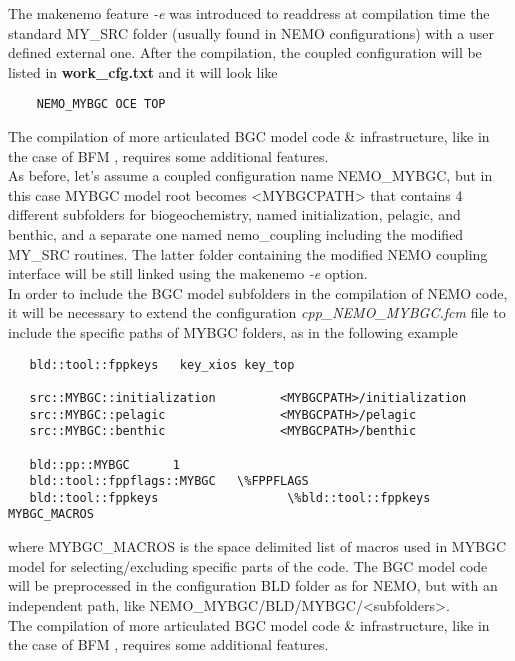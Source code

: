 \documentclass[../main/TOP_manual]{subfiles}
\begin{document}
The makenemo feature \textit{-e} was introduced to readdress at compilation time the standard MY\_SRC folder (usually found in NEMO configurations) with a user defined external one.
After the compilation, the coupled configuration will be listed in \textbf{work\_cfg.txt} and it will look like

\begin{verbatim}
    NEMO_MYBGC OCE TOP
\end{verbatim}

The compilation of more articulated BGC model code \& infrastructure, like in the case of BFM \citep{bfm_nemo_coupling}, requires some additional features. \\

As before, let's assume a coupled configuration name NEMO\_MYBGC, but in this case MYBGC model root becomes <MYBGCPATH> that contains 4 different subfolders for biogeochemistry, named initialization, pelagic, and benthic, and a separate one named nemo\_coupling including the modified MY\_SRC routines. The latter folder containing the modified NEMO coupling interface will be still linked using the makenemo \textit{-e} option. \\

In order to include the BGC model subfolders in the compilation of NEMO code, it will be necessary to extend the configuration \textit{cpp\_NEMO\_MYBGC.fcm} file to include the specific paths of MYBGC folders, as in the following example

\begin{verbatim}
   bld::tool::fppkeys   key_xios key_top

   src::MYBGC::initialization         <MYBGCPATH>/initialization
   src::MYBGC::pelagic                <MYBGCPATH>/pelagic
   src::MYBGC::benthic                <MYBGCPATH>/benthic

   bld::pp::MYBGC      1
   bld::tool::fppflags::MYBGC   \%FPPFLAGS
   bld::tool::fppkeys                  \%bld::tool::fppkeys MYBGC_MACROS
\end{verbatim}

where MYBGC\_MACROS is the space delimited list of macros used in MYBGC model for selecting/excluding specific parts of the code. The BGC model code will be preprocessed in the configuration BLD folder as for NEMO, but with an independent path, like NEMO\_MYBGC/BLD/MYBGC/<subfolders>.\\

The compilation of more articulated BGC model code \& infrastructure, like in the case of BFM \citep{bfm_nemo_coupling}, requires some additional features. \\
\end{document}
